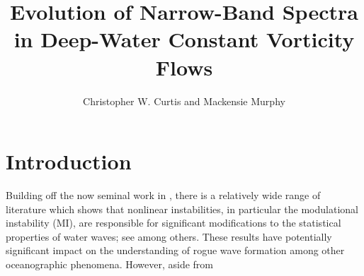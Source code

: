 \documentclass[a4paper,11pt]{article}
\title{Evolution of Narrow-Band Spectra in Deep-Water Constant Vorticity Flows}
\author{Christopher W. Curtis and Mackensie Murphy}
\date{}
\begin{document}
\maketitle
\section*{Introduction}

Building off the now seminal work in \cite{alber}, there is a relatively wide range of literature which shows that nonlinear instabilities, in particular the modulational instability (MI), are responsible for significant modifications to the statistical properties of water waves; see \cite{dysthe2,dysthe3,onorato,thomas2012nonlinear} among others.   These results have potentially significant impact on the understanding of rogue wave formation among other oceanographic phenomena.  However, aside from 
\end{document}
